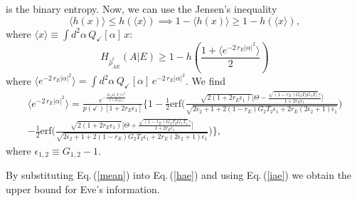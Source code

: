 \documentclass[a4paper]{article}
\newcommand{\mean}[1]{\langle {#1} \rangle}
\newcommand{\be}{\begin{equation}}
\newcommand{\ee}{\end{equation}}
\begin{document}
is the binary entropy.
Now, we can use the Jensen's inequality 
\be
\mean{h(x)} \leq h(\mean{x}) \implies 1-\mean{h(x)} \geq 1- h(\mean{x}),
\ee
where $\mean{x}\equiv \int d^2 \alpha \,Q_\checkmark[\alpha] \,x$:
\be
\label{hae}
H_{\hat{\rho}^\text{f}_{AE}}(A|E) \geq 1- h\left( \frac{1+\mean{e^{-2\, r_E |\alpha|^2}}}{2}\right)
\ee
where 
$\mean{e^{-2\, r_E |\alpha|^2}} =  \int d^2 \alpha \,Q_\checkmark[\alpha] \,e^{-2\, r_E |\alpha|^2}$.
We find
\begin{equation}
\label{mean}
\begin{gathered}
\mean{e^{-2\, r_E |\alpha|^2}} =
\frac{e^{-\frac{2 r_E G_1 T_1|\gamma|^2}{1 + 2 r_E \epsilon_1}}}{p(\checkmark)[1 + 2 r_E \epsilon_1]}\Bigg\{1 - \frac{1}{2}\text{erf}\Bigg(\frac{\sqrt{2(1 + 2 r_E \epsilon_1)}\Big[\Theta - \frac{\sqrt{(1 - r_E)G_2 T_2 G_1 T_1}\gamma}{1 + 2 r_E \epsilon_1}\Big]}{\sqrt{2 \epsilon_2 + 1 + 2 (1 - r_E)G_2 T_2\epsilon_1 + 2 r_E(2 \epsilon_2 + 1)\epsilon_1}}\Bigg)\\
- \frac{1}{2}\text{erf}\Bigg(\frac{\sqrt{2(1 + 2 r_E \epsilon_1)}\Big[\Theta + \frac{\sqrt{(1 - r_E)G_2 T_2 G_1 T_1}\gamma}{1 + 2 r_E \epsilon_1}\Big]}{\sqrt{2 \epsilon_2 + 1 + 2(1 - r_E)G_2 T_2\epsilon_1 + 2 r_E(2 \epsilon_2 + 1)\epsilon_1}}\Bigg)\Bigg\},
\end{gathered}
\end{equation}
where $\epsilon_{1,2}\equiv G_{1,2}-1$.

By substituting Eq.\,(\ref{mean}) into Eq.\,(\ref{hae}) and using Eq.\,(\ref{iae}) we obtain the upper bound for Eve's information.
\end{document}
